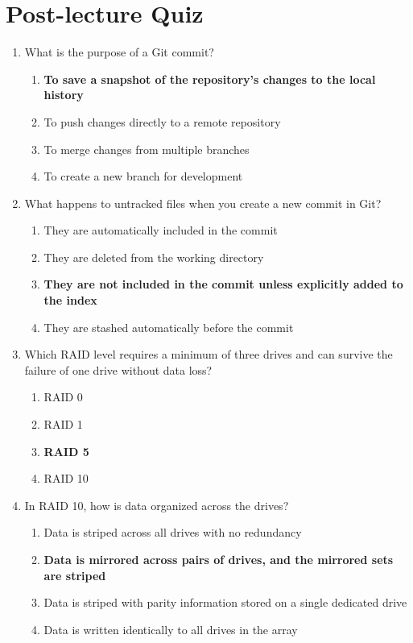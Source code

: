 \newpage

\section{Post-lecture Quiz}

\begin{enumerate}
    \item What is the purpose of a Git commit?
    \begin{enumerate}
        \item \textbf{To save a snapshot of the repository's changes to the
              local history}
        \item To push changes directly to a remote repository
        \item To merge changes from multiple branches
        \item To create a new branch for development
    \end{enumerate}

    \item What happens to untracked files when you create a new commit in Git?
    \begin{enumerate}
        \item They are automatically included in the commit
        \item They are deleted from the working directory
        \item \textbf{They are not included in the commit unless explicitly
              added to the index}
        \item They are stashed automatically before the commit
    \end{enumerate}

    \item Which RAID level requires a minimum of three drives and can survive
          the failure of one drive without data loss?
    \begin{enumerate}
        \item RAID 0
        \item RAID 1
        \item \textbf{RAID 5}
        \item RAID 10
    \end{enumerate}

    \item In RAID 10, how is data organized across the drives?
    \begin{enumerate}
        \item Data is striped across all drives with no redundancy
        \item \textbf{Data is mirrored across pairs of drives, and the mirrored
                      sets are striped}
        \item Data is striped with parity information stored on a single
              dedicated drive
        \item Data is written identically to all drives in the array
    \end{enumerate}


\end{enumerate}
